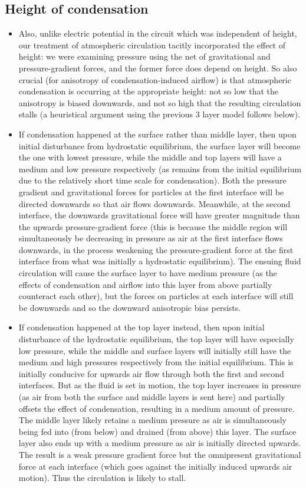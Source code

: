 \subsection{Height of condensation}

\begin{itemize}
	\item Also, unlike electric potential in the circuit which was independent of height, our treatment of atmospheric circulation tacitly incorporated the effect of height: we were examining pressure using the net of gravitational and pressure-gradient forces, and the former force does depend on height. So also crucial (for anisotropy of condensation-induced airflow) is that atmospheric condensation is occurring at the appropriate height: not so low that the anisotropy is biased downwards, and not so high that the resulting circulation stalls (a heuristical argument using the previous 3 layer model follows below).
	\item If condensation happened at the surface rather than middle layer, then upon initial disturbance from hydrostatic equilibrium, the surface layer will become the one with lowest pressure, while the middle and top layers will have a medium and low pressure respectively (as remains from the initial equilibrium due to the relatively short time scale for condensation). Both the pressure gradient and gravitational forces for particles at the first interface will be directed downwards so that air flows downwards. Meanwhile, at the second interface, the downwards gravitational force will have greater magnitude than the upwards pressure-gradient force (this is because the middle region will simultaneously be decreasing in pressure as air at the first interface flows downwards, in the process weakening the pressure-gradient force at the first interface from what was initially a hydrostatic equilibrium). The ensuing fluid circulation will cause the surface layer to have medium pressure (as the effects of condensation and airflow into this layer from above partially counteract each other), but the forces on particles at each interface will still be downwards and so the downward anisotropic bias persists.
	\item If condensation happened at the top layer instead, then upon initial disturbance of the hydrostatic equilibrium, the top layer will have especially low pressure, while the middle and surface layers will initially still have the medium and high pressures respectively from the initial equilibrium. This is initially conducive for upwards air flow through both the first and second interfaces. But as the fluid is set in motion, the top layer increases in pressure (as air from both the surface and middle layers is sent here) and partially offsets the effect of condensation, resulting in a medium amount of pressure. The middle layer likely retains a medium pressure as air is simultaneously being fed into (from below) and drained (from above) this layer. The surface layer also ends up with a medium pressure as air is initially directed upwards. The result is a weak pressure gradient force but the omnipresent gravitational force at each interface (which goes against the initially induced upwards air motion). Thus the circulation is likely to stall.
\end{itemize}
